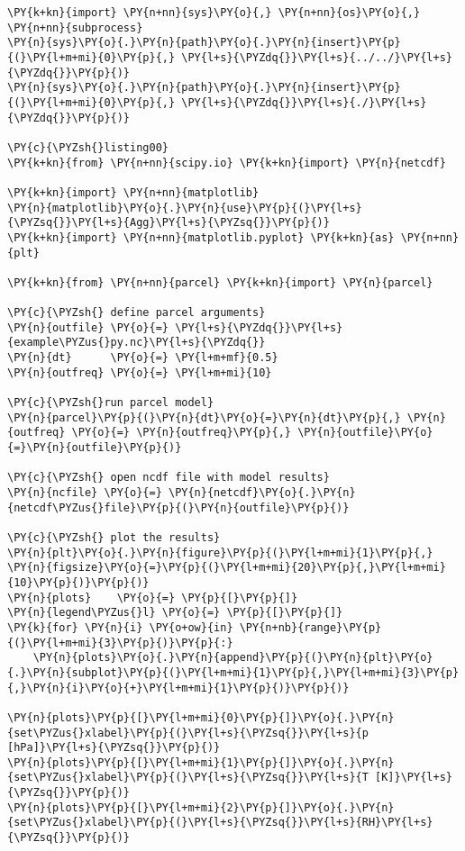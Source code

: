 \begin{Verbatim}[commandchars=\\\{\}]
\PY{k+kn}{import} \PY{n+nn}{sys}\PY{o}{,} \PY{n+nn}{os}\PY{o}{,} \PY{n+nn}{subprocess}
\PY{n}{sys}\PY{o}{.}\PY{n}{path}\PY{o}{.}\PY{n}{insert}\PY{p}{(}\PY{l+m+mi}{0}\PY{p}{,} \PY{l+s}{\PYZdq{}}\PY{l+s}{../../}\PY{l+s}{\PYZdq{}}\PY{p}{)}
\PY{n}{sys}\PY{o}{.}\PY{n}{path}\PY{o}{.}\PY{n}{insert}\PY{p}{(}\PY{l+m+mi}{0}\PY{p}{,} \PY{l+s}{\PYZdq{}}\PY{l+s}{./}\PY{l+s}{\PYZdq{}}\PY{p}{)}

\PY{c}{\PYZsh{}listing00}
\PY{k+kn}{from} \PY{n+nn}{scipy.io} \PY{k+kn}{import} \PY{n}{netcdf}

\PY{k+kn}{import} \PY{n+nn}{matplotlib}
\PY{n}{matplotlib}\PY{o}{.}\PY{n}{use}\PY{p}{(}\PY{l+s}{\PYZsq{}}\PY{l+s}{Agg}\PY{l+s}{\PYZsq{}}\PY{p}{)}
\PY{k+kn}{import} \PY{n+nn}{matplotlib.pyplot} \PY{k+kn}{as} \PY{n+nn}{plt}

\PY{k+kn}{from} \PY{n+nn}{parcel} \PY{k+kn}{import} \PY{n}{parcel}

\PY{c}{\PYZsh{} define parcel arguments}
\PY{n}{outfile} \PY{o}{=} \PY{l+s}{\PYZdq{}}\PY{l+s}{example\PYZus{}py.nc}\PY{l+s}{\PYZdq{}}
\PY{n}{dt}      \PY{o}{=} \PY{l+m+mf}{0.5}
\PY{n}{outfreq} \PY{o}{=} \PY{l+m+mi}{10}

\PY{c}{\PYZsh{}run parcel model}
\PY{n}{parcel}\PY{p}{(}\PY{n}{dt}\PY{o}{=}\PY{n}{dt}\PY{p}{,} \PY{n}{outfreq} \PY{o}{=} \PY{n}{outfreq}\PY{p}{,} \PY{n}{outfile}\PY{o}{=}\PY{n}{outfile}\PY{p}{)}

\PY{c}{\PYZsh{} open ncdf file with model results}
\PY{n}{ncfile} \PY{o}{=} \PY{n}{netcdf}\PY{o}{.}\PY{n}{netcdf\PYZus{}file}\PY{p}{(}\PY{n}{outfile}\PY{p}{)}

\PY{c}{\PYZsh{} plot the results}
\PY{n}{plt}\PY{o}{.}\PY{n}{figure}\PY{p}{(}\PY{l+m+mi}{1}\PY{p}{,} \PY{n}{figsize}\PY{o}{=}\PY{p}{(}\PY{l+m+mi}{20}\PY{p}{,}\PY{l+m+mi}{10}\PY{p}{)}\PY{p}{)}
\PY{n}{plots}    \PY{o}{=} \PY{p}{[}\PY{p}{]}
\PY{n}{legend\PYZus{}l} \PY{o}{=} \PY{p}{[}\PY{p}{]}
\PY{k}{for} \PY{n}{i} \PY{o+ow}{in} \PY{n+nb}{range}\PY{p}{(}\PY{l+m+mi}{3}\PY{p}{)}\PY{p}{:}
    \PY{n}{plots}\PY{o}{.}\PY{n}{append}\PY{p}{(}\PY{n}{plt}\PY{o}{.}\PY{n}{subplot}\PY{p}{(}\PY{l+m+mi}{1}\PY{p}{,}\PY{l+m+mi}{3}\PY{p}{,}\PY{n}{i}\PY{o}{+}\PY{l+m+mi}{1}\PY{p}{)}\PY{p}{)}

\PY{n}{plots}\PY{p}{[}\PY{l+m+mi}{0}\PY{p}{]}\PY{o}{.}\PY{n}{set\PYZus{}xlabel}\PY{p}{(}\PY{l+s}{\PYZsq{}}\PY{l+s}{p [hPa]}\PY{l+s}{\PYZsq{}}\PY{p}{)}
\PY{n}{plots}\PY{p}{[}\PY{l+m+mi}{1}\PY{p}{]}\PY{o}{.}\PY{n}{set\PYZus{}xlabel}\PY{p}{(}\PY{l+s}{\PYZsq{}}\PY{l+s}{T [K]}\PY{l+s}{\PYZsq{}}\PY{p}{)}
\PY{n}{plots}\PY{p}{[}\PY{l+m+mi}{2}\PY{p}{]}\PY{o}{.}\PY{n}{set\PYZus{}xlabel}\PY{p}{(}\PY{l+s}{\PYZsq{}}\PY{l+s}{RH}\PY{l+s}{\PYZsq{}}\PY{p}{)}


\end{Verbatim}
